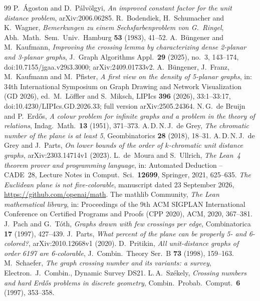 \documentclass[11pt,colorlinks]{charlie}
\begin{document}
\begin{thebibliography}{99}\small
{} P.~Ágoston and D.~Pálvölgyi, \emph{An improved constant factor for the unit distance problem}, arXiv:2006.06285.
 R.~Bodendiek, H.~Schumacher and K.~Wagner, \emph{Bemerkungen zu einem Sechsfarbenproblem von G.~Ringel}, Abh.\ Math.\ Sem.\ Univ.\ Hamburg \textbf{53} (1983), 41--52.
 A.~Büngener and M.~Kaufmann, \emph{Improving the crossing lemma by characterizing dense 2-planar and 3-planar graphs}, J.\ Graph Algorithms Appl.\ \textbf{29} (2025), no.~3, 143--174, doi:10.7155/jgaa.v29i3.3000; arXiv:2409.01733v2.
 A.~Büngener, J.~Franz, M.~Kaufmann and M.~Pfister, \emph{A first view on the density of 5-planar graphs}, in: 34th International Symposium on Graph Drawing and Network Visualization (GD 2026), ed.\ M.~Löffler and S.~Miksch, LIPIcs \textbf{396} (2026), 33:1--33:17, doi:10.4230/LIPIcs.GD.2026.33; full version arXiv:2505.24364.
 N.\,G.~de Bruijn and P.~Erd\H{o}s, \emph{A colour problem for infinite graphs and a problem in the theory of relations}, Indag.\ Math.\ \textbf{13} (1951), 371--373.
 A.\,D.\,N.\,J.~de Grey, \emph{The chromatic number of the plane is at least 5}, Geombinatorics \textbf{28} (2018), 18--31.
 A.\,D.\,N.\,J.~de Grey and J.~Parts, \emph{On lower bounds of the order of $k$-chromatic unit distance graphs}, arXiv:2303.14714v1 (2023).
 L.~de~Moura and S.~Ullrich, \emph{The Lean~4 theorem prover and programming language}, in: Automated Deduction -- CADE~28, Lecture Notes in Comput.\ Sci.\ \textbf{12699}, Springer, 2021, 625--635.
 \emph{The Euclidean plane is not five-colorable}, manuscript dated 23 September 2026, \url{https://github.com/openai/math}.
 The mathlib Community, \emph{The Lean mathematical library}, in: Proceedings of the 9th ACM SIGPLAN International Conference on Certified Programs and Proofs (CPP 2020), ACM, 2020, 367--381.
 J.~Pach and G.~Tóth, \emph{Graphs drawn with few crossings per edge}, Combinatorica \textbf{17} (1997), 427--439.
 J.~Parts, \emph{What percent of the plane can be properly 5- and 6-colored?}, arXiv:2010.12668v1 (2020).
 D.~Pritikin, \emph{All unit-distance graphs of order 6197 are 6-colorable}, J.\ Combin.\ Theory Ser.\ B \textbf{73} (1998), 159--163.
 M.~Schaefer, \emph{The graph crossing number and its variants: a survey}, Electron.\ J.\ Combin., Dynamic Survey DS21.
 L.\,A.~Székely, \emph{Crossing numbers and hard Erd\H{o}s problems in discrete geometry}, Combin.\ Probab.\ Comput.\ \textbf{6} (1997), 353--358.
\end{thebibliography}
\end{document}
